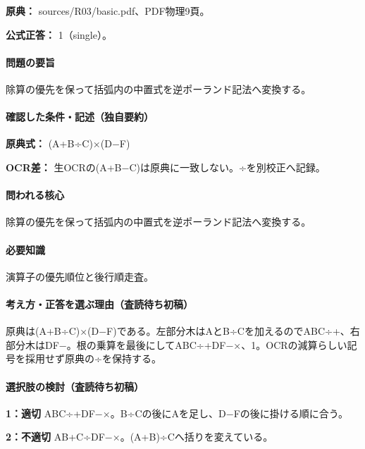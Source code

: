 \noindent\textbf{原典：} sources/R03/basic.pdf、PDF物理9頁。

\textbf{公式正答：} 1（single）。

\paragraph{問題の要旨} 除算の優先を保って括弧内の中置式を逆ポーランド記法へ変換する。

\paragraph{確認した条件・記述（独自要約）}\mbox{}\par

\noindent\textbf{原典式：} (A+B÷C)×(D−F)\par

\noindent\textbf{OCR差：} 生OCRの(A+B−C)は原典に一致しない。÷を別校正へ記録。\par

\paragraph{問われる核心} 除算の優先を保って括弧内の中置式を逆ポーランド記法へ変換する。

\paragraph{必要知識} 演算子の優先順位と後行順走査。

\paragraph{考え方・正答を選ぶ理由（査読待ち初稿）} 原典は(A+B÷C)×(D−F)である。左部分木はAとB÷Cを加えるのでABC÷+、右部分木はDF−。根の乗算を最後にしてABC÷+DF−×、1。OCRの減算らしい記号を採用せず原典の÷を保持する。

\paragraph{選択肢の検討（査読待ち初稿）}\mbox{}\par

\noindent\textbf{1：適切} ABC÷+DF−×。B÷Cの後にAを足し、D−Fの後に掛ける順に合う。\par

\noindent\textbf{2：不適切} AB+C÷DF−×。(A+B)÷Cへ括りを変えている。\par

